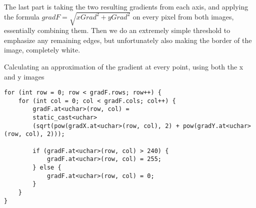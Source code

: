 The last part is taking the two resulting gradients from each axis, and applying the formula $gradF = \sqrt{xGrad^2+yGrad^2}$ on every pixel from both images, essentially combining them. Then we do an extremely simple threshold to emphasize any remaining edges, but unfortunately also making the border of the image, completely white.

\begin{listing}[H]
	\caption{Calculating an approximation of the gradient at every point, using both the x and y images}
	\label{listing:finalGradient}
	\begin{verbatim}
for (int row = 0; row < gradF.rows; row++) {
	for (int col = 0; col < gradF.cols; col++) {
		gradF.at<uchar>(row, col) = 
		static_cast<uchar>
		(sqrt(pow(gradX.at<uchar>(row, col), 2) + pow(gradY.at<uchar>(row, col), 2)));
		
		if (gradF.at<uchar>(row, col) > 240) {
			gradF.at<uchar>(row, col) = 255;
		} else {
			gradF.at<uchar>(row, col) = 0;
		}
	}
}
	\end{verbatim}
\end{listing}
